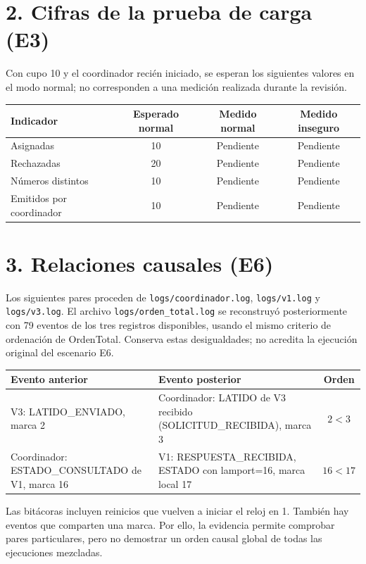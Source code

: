 \documentclass[11pt,a4paper]{article}
\begin{document}
\section*{2. Cifras de la prueba de carga (E3)}
Con cupo 10 y el coordinador recién iniciado, se esperan los siguientes valores en el modo normal; no corresponden a una medición realizada durante la revisión.
\begin{center}
\small
\begin{tabular}{|l|c|c|c|}\hline
Indicador & Esperado normal & Medido normal & Medido inseguro \\ \hline
Asignadas & 10 & Pendiente & Pendiente \\
Rechazadas & 20 & Pendiente & Pendiente \\
Números distintos & 10 & Pendiente & Pendiente \\
Emitidos por coordinador & 10 & Pendiente & Pendiente \\ \hline
\end{tabular}
\end{center}
\newpage
\section*{3. Relaciones causales (E6)}
Los siguientes pares proceden de \texttt{logs/coordinador.log}, \texttt{logs/v1.log} y \texttt{logs/v3.log}. El archivo \texttt{logs/orden\_total.log} se reconstruyó posteriormente con 79 eventos de los tres registros disponibles, usando el mismo criterio de ordenación de OrdenTotal. Conserva estas desigualdades; no acredita la ejecución original del escenario E6.
\begin{center}
\small
\begin{tabular}{|>{\raggedright\arraybackslash}p{5.6cm}|>{\raggedright\arraybackslash}p{5.6cm}|c|}\hline
Evento anterior & Evento posterior & Orden \\ \hline
V3: LATIDO\_ENVIADO, marca 2 & Coordinador: LATIDO de V3 recibido (SOLICITUD\_RECIBIDA), marca 3 & $2<3$ \\ \hline
Coordinador: ESTADO\_CONSULTADO de V1, marca 16 & V1: RESPUESTA\_RECIBIDA, ESTADO con lamport=16, marca local 17 & $16<17$ \\ \hline
\end{tabular}
\end{center}
Las bitácoras incluyen reinicios que vuelven a iniciar el reloj en 1. También hay eventos que comparten una marca. Por ello, la evidencia permite comprobar pares particulares, pero no demostrar un orden causal global de todas las ejecuciones mezcladas.
\end{document}
